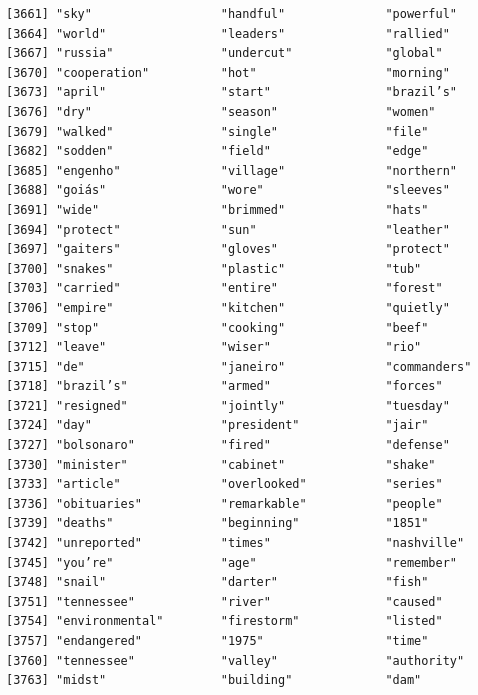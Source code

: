 \documentclass[
  letterpaper,
  DIV=11,
  numbers=noendperiod]{scrartcl}
\begin{document}
\begin{verbatim}
[3661] "sky"                  "handful"              "powerful"            
[3664] "world"                "leaders"              "rallied"             
[3667] "russia"               "undercut"             "global"              
[3670] "cooperation"          "hot"                  "morning"             
[3673] "april"                "start"                "brazil’s"            
[3676] "dry"                  "season"               "women"               
[3679] "walked"               "single"               "file"                
[3682] "sodden"               "field"                "edge"                
[3685] "engenho"              "village"              "northern"            
[3688] "goiás"                "wore"                 "sleeves"             
[3691] "wide"                 "brimmed"              "hats"                
[3694] "protect"              "sun"                  "leather"             
[3697] "gaiters"              "gloves"               "protect"             
[3700] "snakes"               "plastic"              "tub"                 
[3703] "carried"              "entire"               "forest"              
[3706] "empire"               "kitchen"              "quietly"             
[3709] "stop"                 "cooking"              "beef"                
[3712] "leave"                "wiser"                "rio"                 
[3715] "de"                   "janeiro"              "commanders"          
[3718] "brazil’s"             "armed"                "forces"              
[3721] "resigned"             "jointly"              "tuesday"             
[3724] "day"                  "president"            "jair"                
[3727] "bolsonaro"            "fired"                "defense"             
[3730] "minister"             "cabinet"              "shake"               
[3733] "article"              "overlooked"           "series"              
[3736] "obituaries"           "remarkable"           "people"              
[3739] "deaths"               "beginning"            "1851"                
[3742] "unreported"           "times"                "nashville"           
[3745] "you’re"               "age"                  "remember"            
[3748] "snail"                "darter"               "fish"                
[3751] "tennessee"            "river"                "caused"              
[3754] "environmental"        "firestorm"            "listed"              
[3757] "endangered"           "1975"                 "time"                
[3760] "tennessee"            "valley"               "authority"           
[3763] "midst"                "building"             "dam"                 

\end{verbatim}
\end{document}
